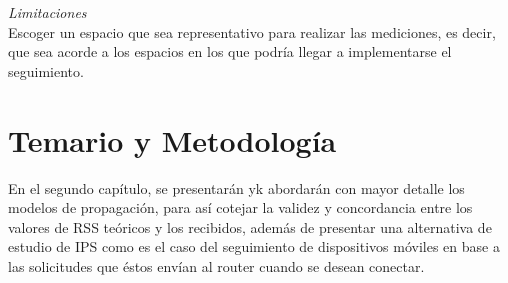 \textit{Limitaciones}\\

Escoger un espacio que sea representativo para realizar las mediciones, es decir, que sea acorde a los espacios en los que podría llegar a implementarse el seguimiento.\\



\section{Temario y Metodología}

En el segundo capítulo, se presentarán yk abordarán con mayor detalle los modelos de propagación, para así cotejar la validez y concordancia entre los valores de RSS teóricos y los recibidos, además de presentar una alternativa de estudio de IPS como es el caso del seguimiento de dispositivos móviles en base a las solicitudes que éstos envían al router cuando se desean conectar. 